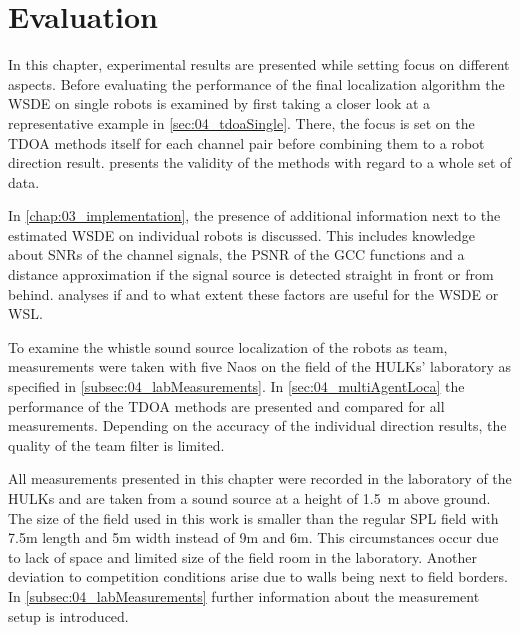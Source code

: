 \chapter{Evaluation}


In this chapter, experimental results are presented while setting
focus on different aspects.
Before evaluating the performance of the final localization algorithm the
\ac{WSDE} on single robots is examined by first taking a closer look
at a representative example in \cref{sec:04_tdoaSingle}.
There, the focus is set on the \ac{TDOA} methods itself for each channel pair
before combining them to a robot direction result.
 presents the validity of the methods with
regard to a whole set of data.

In \cref{chap:03_implementation}, the presence of additional
information next to the estimated \ac{WSDE} on individual robots
is discussed.
This includes knowledge about \acp{SNR} of the channel signals, the \ac{PSNR}
of the \ac{GCC} functions and a distance approximation if the signal source
is detected straight in front or from behind.
 analyses if and to
what extent these factors are useful for the \ac{WSDE} or \ac{WSL}.

To examine the whistle sound source localization of the robots as team,
measurements were taken with five Naos on the field of the HULKs' laboratory
as specified in \cref{subsec:04_labMeasurements}.
In \cref{sec:04_multiAgentLoca} the performance of the \ac{TDOA} methods are presented
and compared for all measurements.
Depending on the accuracy of the individual direction results, the quality
of the team filter is limited.

All measurements presented in this chapter were recorded in the
laboratory of the HULKs and are taken from a sound source at a height of
\SI{1.5}{\meter} above ground.
The size of the field used in this work is smaller than the regular \ac{SPL}
field with 7.5\si{m} length and 5\si{m} width instead of 9\si{\meter} and 6\si{\meter}.
This circumstances occur due to lack of space and limited size of the
field room in the laboratory.
Another deviation to competition conditions arise due to walls being next to field borders.
In \cref{subsec:04_labMeasurements} further information about the measurement setup
is introduced.







